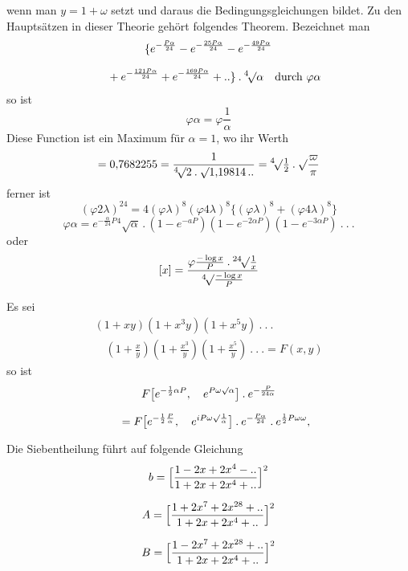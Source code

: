 wenn man \(y=1+\omega\) setzt und daraus die Bedingungsgleichungen bildet.
Zu den Hauptsätzen in dieser Theorie gehört folgendes Theorem. 
Bezeichnet man
\[
\begin{gathered}\{e^{-\frac{P\alpha}{24}}-e^{-\frac{25P\alpha}{24}}
-e^{-\frac{49P\alpha}{24}}\\[7pt]\quad{}+e^{-\frac{121P\alpha}{24}}
+e^{-\frac{169P\alpha}{24}}+\mathinner{..}\}\mathbin{.}{}^{4}\!\surd\alpha
\quad\text{durch }\varphi\alpha\end{gathered}
\]
so ist
\[
\varphi\alpha=\varphi\frac{1}{\alpha}
\]
Diese Function ist ein Maximum für $\alpha=1$, wo ihr Werth
\[
=0{,}7682255=\frac{1}{{}^{4}\!\surd2\mathbin{.}\surd1{,}19814\mathinner{..}}
={}^{4}\!\surd\tfrac12\mathbin{.}\surd\frac{\varpi}{\pi}
\]
ferner ist
\[
(\varphi 2\lambda)^{24}=4(\varphi\lambda)^8(\varphi 4\lambda)^8
\{(\varphi\lambda)^8+(\varphi 4\lambda)^8\}
\]
\[
\varphi\alpha=e^{-\frac{\alpha}{24}P}{}^{4}\!\surd\alpha\mathbin{.}
(1-e^{-aP})(1-e^{-2\alpha P})(1-e^{-3\alpha P})\ .\ .\ .
\]
oder
\[
[x]=\frac{\varphi\frac{-\log x}{P}\mathbin{.}{}^{24}\!\surd\frac1x}
{{}^{4}\!\surd\frac{-\log x}{P}}
\]

Es sei
\[
\begin{gathered}(1+xy)(1+x^3y)(1+x^5y)\ .\ .\ .
\\[7pt]\quad{}(1+\tfrac{x}{y})(1+\tfrac{x^3}{y})(1+\tfrac{x^5}{y})\ .\ .\ .=F(x,y)\end{gathered}
\]
so ist
\[
\begin{gathered}F\bigl[e^{-\frac12\alpha P},\quad e^{P\omega\surd\alpha}\bigr]
\mathbin{.}e^{-\frac{P}{24\alpha}}
\\[7pt]\quad{}=F\bigl[e^{-\frac12\frac{P}{\alpha}},\quad
e^{iP\omega\surd\frac1\alpha}\bigr]
\mathbin{.}e^{-\frac{P\alpha}{24}}\mathbin{.}e^{\frac12P\omega\omega},\end{gathered}
\]

Die Siebentheilung führt auf folgende Gleichung
\[
\begin{gathered}
b=\Bigl[\frac{1-2x+2x^4-\mathinner{..}}{1+2x+2x^4+\mathinner{..}}\Bigr]^2\\[7pt]
A=\Bigl[\frac{1+2x^7+2x^{28}+\mathinner{..}}{1+2x+2x^4+\mathinner{..}}\Bigr]^2\\[7pt]
B=\Bigl[\frac{1-2x^7+2x^{28}+\mathinner{..}}{1+2x+2x^4+\mathinner{..}}\Bigr]^2
\end{gathered}
\]

